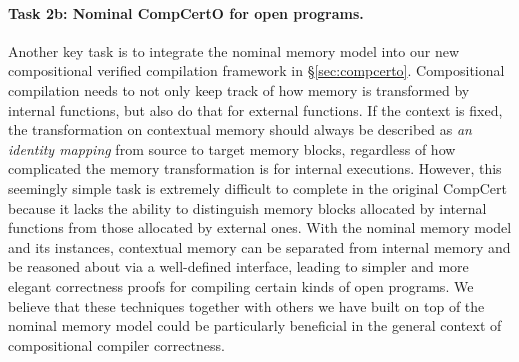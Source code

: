 \vspace*{-2ex}
\paragraph*{Task 2b: Nominal CompCertO for open programs.}
Another key task is to integrate the nominal memory model into our
new compositional verified compilation framework in
\S\ref{sec:compcerto}.  Compositional compilation needs to not only
keep track of how memory is transformed by internal functions, but
also do that for external functions.  If the context is fixed, the
transformation on contextual memory should always be described as
\emph{an identity mapping} from source to target memory blocks,
regardless of how complicated the memory transformation is for
internal executions.  However, this seemingly simple task is extremely
difficult to complete in the original CompCert because it lacks the
ability to distinguish memory blocks allocated by internal functions
from those allocated by external ones. With the nominal memory model and its
instances, contextual memory can be separated from internal memory and
be reasoned about via a well-defined interface, leading to simpler and
more elegant correctness proofs for compiling certain kinds of open
programs. We believe that these techniques together with others we
have built on top of the nominal memory model could be particularly
beneficial in the general context of compositional compiler
correctness.

